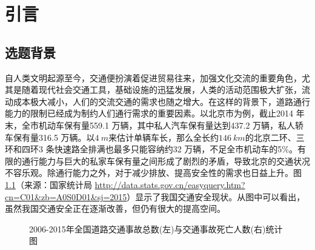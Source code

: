 \chapter{引言}
\label{cha:intro}

\section{选题背景}
\label{sec:background}
自人类文明起源至今，交通便扮演着促进贸易往来，加强文化交流的重要角色，尤其是随着现代社会交通工具，基础设施的迅猛发展，人类的活动范围极大扩张，流动成本极大减小，人们的交流交通的需求也随之增大。在这样的背景下，道路通行能力的限制已经成为制约人们通行需求的重要因素。以北京市为例，截止2014 年末，全市机动车保有量559.1 万辆，其中私人汽车保有量达到437.2 万辆，私人轿车保有量316.5 万辆。以$\SI{4}{m}$来估计单辆车长，那么全长约$\SI{146}{km}$的北京二环、三环和四环3 条快速路全排满也最多只能容纳约32 万辆，不足全市机动车的5\%。有限的通行能力与巨大的私家车保有量之间形成了剧烈的矛盾，导致北京的交通状况不容乐观。除通行能力之外，对于减少排放、提高安全性的需求也日益上升\cite{Ploeg2014Analysis}。图\ref{fig:traffic}（来源：国家统计局 \url{http://data.stats.gov.cn/easyquery.htm?cn=C01&zb=A0S0D01&sj=2015}）显示了我国交通安全现状。从图中可以看出，虽然我国交通安全正在逐渐改善，但仍有很大的提高空间。

\begin{figure}[htbp]
\begin{minipage}[t]{0.4\linewidth}
\centering
{}
\end{minipage}%
\hspace{+2cm}
\begin{minipage}[t]{0.4\linewidth}
\centering
{}
\end{minipage}
\captionsetup{margin=3.cm}
\caption[交通事故统计图]{2006-2015年全国道路交通事故总数(左)与交通事故死亡人数(右)统计图}
\label{fig:traffic}
\end{figure}

